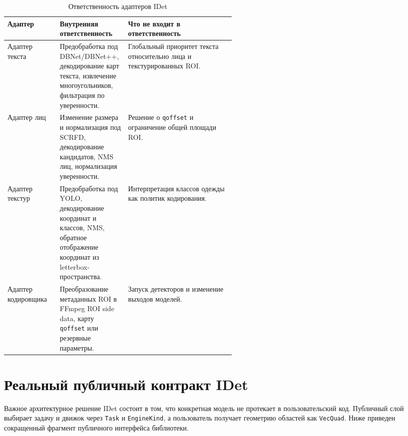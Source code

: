 \documentclass[12pt,a4paper,oneside,openany]{report}
\begin{document}
\begin{table}[H]\centering\caption{Ответственность адаптеров IDet}\label{tab:adapter_responsibilities}\small\begin{tabularx}{\linewidth}{@{}P{0.23\linewidth}P{0.30\linewidth}Y@{}}\toprule
Адаптер & Внутренняя ответственность & Что не входит в ответственность \\
\midrule
Адаптер текста & Предобработка под DBNet/DBNet++, декодирование карт текста, извлечение многоугольников, фильтрация по уверенности. & Глобальный приоритет текста относительно лица и текстурированных ROI. \\
Адаптер лиц & Изменение размера и нормализация под SCRFD, декодирование кандидатов, NMS лиц, нормализация уверенности. & Решение о \texttt{qoffset} и ограничение общей площади ROI. \\
Адаптер текстур & Предобработка под YOLO, декодирование координат и классов, NMS, обратное отображение координат из letterbox-пространства. & Интерпретация классов одежды как политик кодирования. \\
Адаптер кодировщика & Преобразование метаданных ROI в FFmpeg ROI side data, карту \texttt{qoffset} или резервные параметры. & Запуск детекторов и изменение выходов моделей. \\
\bottomrule\end{tabularx}
\end{table}

\section{Реальный публичный контракт IDet}

Важное архитектурное решение IDet состоит в том, что конкретная модель не протекает в пользовательский код. Публичный слой выбирает задачу и движок через \texttt{Task} и \texttt{EngineKind}, а пользователь получает геометрию областей как \texttt{VecQuad}. Ниже приведен сокращенный фрагмент публичного интерфейса библиотеки.
\end{document}
